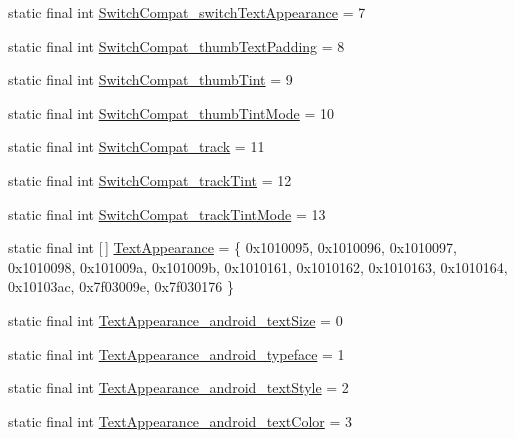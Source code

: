 \begin{DoxyCompactItemize}
\item 
static final int \mbox{\hyperlink{classcom_1_1synnapps_1_1carouselview_1_1_r_1_1styleable_a956b9f1f43e9b304f6e2dad3bc6cd7c4}{Switch\+Compat\+\_\+switch\+Text\+Appearance}} = 7
\item 
static final int \mbox{\hyperlink{classcom_1_1synnapps_1_1carouselview_1_1_r_1_1styleable_a590e58db555571511a955a6c20985beb}{Switch\+Compat\+\_\+thumb\+Text\+Padding}} = 8
\item 
static final int \mbox{\hyperlink{classcom_1_1synnapps_1_1carouselview_1_1_r_1_1styleable_aada75dd29987da9b57a2a7f3e9cd786c}{Switch\+Compat\+\_\+thumb\+Tint}} = 9
\item 
static final int \mbox{\hyperlink{classcom_1_1synnapps_1_1carouselview_1_1_r_1_1styleable_a2aa5f82d207151b52a9b3376d27026dd}{Switch\+Compat\+\_\+thumb\+Tint\+Mode}} = 10
\item 
static final int \mbox{\hyperlink{classcom_1_1synnapps_1_1carouselview_1_1_r_1_1styleable_a8280875c21482e867219d5a2076b52dc}{Switch\+Compat\+\_\+track}} = 11
\item 
static final int \mbox{\hyperlink{classcom_1_1synnapps_1_1carouselview_1_1_r_1_1styleable_a400063eaf4d5077e68b13725a5a21ac8}{Switch\+Compat\+\_\+track\+Tint}} = 12
\item 
static final int \mbox{\hyperlink{classcom_1_1synnapps_1_1carouselview_1_1_r_1_1styleable_a50313a2ef7b8edbb91683bca25ea982f}{Switch\+Compat\+\_\+track\+Tint\+Mode}} = 13
\item 
static final int \mbox{[}$\,$\mbox{]} \mbox{\hyperlink{classcom_1_1synnapps_1_1carouselview_1_1_r_1_1styleable_ac95814064344e3c3d2a31cba448ea719}{Text\+Appearance}} = \{ 0x1010095, 0x1010096, 0x1010097, 0x1010098, 0x101009a, 0x101009b, 0x1010161, 0x1010162, 0x1010163, 0x1010164, 0x10103ac, 0x7f03009e, 0x7f030176 \}
\item 
static final int \mbox{\hyperlink{classcom_1_1synnapps_1_1carouselview_1_1_r_1_1styleable_a66bca6fe031962514a1c8a76e1db5747}{Text\+Appearance\+\_\+android\+\_\+text\+Size}} = 0
\item 
static final int \mbox{\hyperlink{classcom_1_1synnapps_1_1carouselview_1_1_r_1_1styleable_ad0ecd1316678a331eace76e062b36d83}{Text\+Appearance\+\_\+android\+\_\+typeface}} = 1
\item 
static final int \mbox{\hyperlink{classcom_1_1synnapps_1_1carouselview_1_1_r_1_1styleable_a43a5756708a64b0e370efd933ffb6c98}{Text\+Appearance\+\_\+android\+\_\+text\+Style}} = 2
\item 
static final int \mbox{\hyperlink{classcom_1_1synnapps_1_1carouselview_1_1_r_1_1styleable_addad4d60be6d990d2c3d0b32efe6272c}{Text\+Appearance\+\_\+android\+\_\+text\+Color}} = 3

\end{DoxyCompactItemize}
